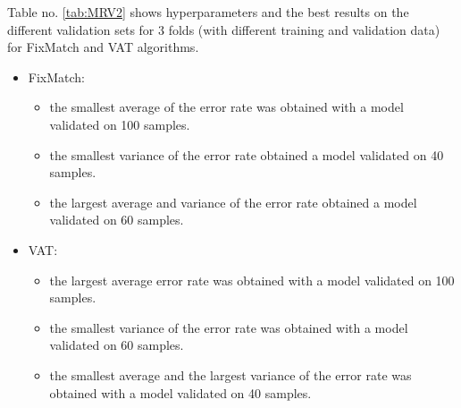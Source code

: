 \documentclass[12pt]{article}
\theoremstyle{definition}
\DeclareRobustCommand{\[}{\begin{equation}}
\DeclareRobustCommand{\]}{\end{equation}}
\begin{document}
\par Table no. \ref{tab:MRV2} shows hyperparameters and the best results on the different validation sets for 3 folds (with different training and validation data) for FixMatch and VAT algorithms.
\begin{itemize}
    \item FixMatch:
    \begin{itemize}
        \item the smallest average of the error rate was obtained with a model validated on 100 samples.
        \item the smallest variance of the error rate obtained a model validated on 40 samples.
        \item the largest average and variance of the error rate obtained a model validated on 60 samples.
    \end{itemize}
    \item VAT:
    \begin{itemize}
        \item the largest average error rate was obtained with a model validated on 100 samples.
        \item the smallest variance of the error rate was obtained with a model validated on 60 samples.
        \item the smallest average  and the largest variance of the error rate was obtained with a model validated on 40 samples.
    \end{itemize}
\end{itemize}
\vspace{5mm} %
\vspace{5mm} %
\end{document}
